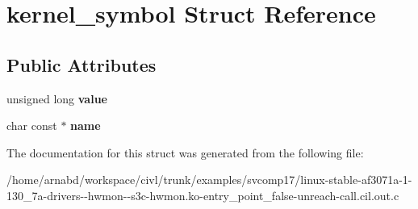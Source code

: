 \hypertarget{structkernel__symbol}{}\section{kernel\+\_\+symbol Struct Reference}
\label{structkernel__symbol}
\subsection*{Public Attributes}
\begin{DoxyCompactItemize}
\item 
\hypertarget{structkernel__symbol_a7f2be35a8234af6024e8b1e7eb7b565c}{}unsigned long {\bfseries value}\label{structkernel__symbol_a7f2be35a8234af6024e8b1e7eb7b565c}

\item 
\hypertarget{structkernel__symbol_a60b4007e458ccddb6a96c2f729df5d76}{}char const $\ast$ {\bfseries name}\label{structkernel__symbol_a60b4007e458ccddb6a96c2f729df5d76}

\end{DoxyCompactItemize}


The documentation for this struct was generated from the following file\+:\begin{DoxyCompactItemize}
\item 
/home/arnabd/workspace/civl/trunk/examples/svcomp17/linux-\/stable-\/af3071a-\/1-\/130\+\_\+7a-\/drivers-\/-\/hwmon-\/-\/s3c-\/hwmon.\+ko-\/entry\+\_\+point\+\_\+false-\/unreach-\/call.\+cil.\+out.\+c\end{DoxyCompactItemize}
